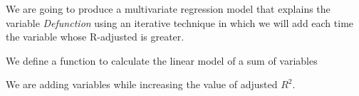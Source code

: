 \documentclass[
]{book}
\newenvironment{Shaded}{\begin{snugshade}}{\end{snugshade}}
\newcommand{\ControlFlowTok}[1]{\textcolor[rgb]{0.13,0.29,0.53}{\textbf{#1}}}
\newcommand{\DataTypeTok}[1]{\textcolor[rgb]{0.13,0.29,0.53}{#1}}
\newcommand{\KeywordTok}[1]{\textcolor[rgb]{0.13,0.29,0.53}{\textbf{#1}}}
\newcommand{\NormalTok}[1]{#1}
\newcommand{\OperatorTok}[1]{\textcolor[rgb]{0.81,0.36,0.00}{\textbf{#1}}}
\newcommand{\StringTok}[1]{\textcolor[rgb]{0.31,0.60,0.02}{#1}}
\begin{document}
We are going to produce a multivariate regression model that explains the variable \emph{Defunction} using an iterative technique in which we will add each time the variable whose R-adjusted is greater.

We define a function to calculate the linear model of a sum of variables

\begin{Shaded}
\end{Shaded}

We are adding variables while increasing the value of adjusted \(R^2\).
\end{document}
